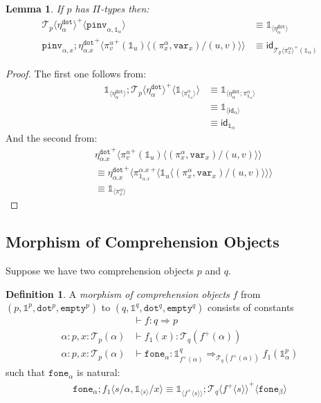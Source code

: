 \documentclass[10pt]{article}
\newtheorem{lemma}{Lemma}
\theoremstyle{definition}
\newtheorem{definition}{Definition}
\newcommand{\yields}{\vdash}
\newcommand{\tcell}{\Rightarrow}
\newcommand{\id}{\mathsf{id}}
\newcommand\TrPlus[2]{\ensuremath{{#1}^+(#2)}}
\newcommand\El[2]{\mathcal{T}_{#1}(#2)}
\newcommand\ApEl[2]{\mathcal{T}_{#1}\langle#2\rangle}
\newcommand\ap[2]{\ensuremath{#1 \langle #2 \rangle }}
\newcommand\ApPlus[2]{\ensuremath{{#1}^+ \langle #2 \rangle }}
\newcommand{\tdot}{\ensuremath{\mathtt{dot}}}
\newcommand{\tempty}{\ensuremath{\mathtt{empty}}}
\newcommand\One{\ensuremath{\mathds{1}}}
\newcommand\var[1]{\ensuremath{\mathtt{var}_{#1}}}
\newcommand\ApOne[1]{\ensuremath{\One_{\langle {#1} \rangle }}}
\newcommand\pinv[1]{\ensuremath{\mathtt{pinv}_{#1}}}
\newcommand\fone[1]{\ensuremath{\mathtt{fone}_{#1}}}
\begin{document}
\begin{lemma}
If $p$ has $\Pi$-types then:
\begin{align*}
\ApPlus{\ApEl{p}{\eta^\tdot_\alpha}}{\pinv{\alpha,\One_\alpha}} &\equiv  \ApOne{\eta^\tdot_\alpha} \\
\pinv{\alpha,x};\ApPlus{\eta^\tdot_{\alpha.x}}{\ap{\TrPlus{\pi^u_v}{\One_u}}{(\pi^\alpha_x,\var{x})/(u,v)}} &\equiv \id_{\TrPlus{\ApEl{p}{\pi^\alpha_x}}{\One_\alpha}}
\end{align*}
\end{lemma}
\begin{proof}
The first one follows from:
\begin{align*}
\ApOne{\eta^\tdot_\alpha} ; \ApPlus{\ApEl{p}{\eta^\tdot_\alpha}}{\ApOne{\pi^\alpha_{\One_\alpha}}} 
&\equiv \ApOne{\eta^\tdot_\alpha;\pi^\alpha_{\One_\alpha}}  \\
&\equiv \ApOne{\id_\alpha} \\
&\equiv \id_{\One_\alpha}
\end{align*}
And the second from:
\begin{align*}
&\ApPlus{\eta^\tdot_{\alpha.x}}{\ap{\TrPlus{\pi^u_v}{\One_u}}{(\pi^\alpha_x,\var{x})/(u,v)}} \\
&\equiv \ApPlus{\eta^\tdot_{\alpha.x}}{\ApPlus{\pi^{\alpha.x}_{1_{\alpha.x}}}{\ap{\One_u}{(\pi^\alpha_x,\var{x})/(u,v)}}} \\
&\equiv \ApOne{\pi^\alpha_x}
\end{align*}
\end{proof}

\subsection{Morphism of Comprehension Objects}

Suppose we have two comprehension objects $p$ and $q$.

\begin{definition}\label{def:morphism-comprehension-object}
A \emph{morphism of comprehension objects} $f$ from $(p, \One^p, \tdot^p, \tempty^p)$ to $(q, \One^q, \tdot^q, \tempty^q)$ consists of constants
\begin{align*}
&\yields f : q \tcell p \\
\alpha : p, x : \El{p}{\alpha} &\yields f_1(x) : \El{q}{\TrPlus{f}{\alpha}} \\
\alpha : p, x : \El{p}{\alpha} &\yields \fone{\alpha} : \One^q_{\TrPlus{f}{\alpha}}  \tcell_{\El{q}{\TrPlus{f}{\alpha}}} f_1(\One^p_\alpha)
\end{align*}
such that $\fone{\alpha}$ is natural:
\begin{align}
\fone{\alpha};\ap{f_1}{s/\alpha, \ApOne{s}/x} \equiv \ApOne{\ApPlus{f}{s}};\ApPlus{\ApEl{q}{\ApPlus{f}{s}}}{\fone{\beta}}
\end{align}
\end{definition}
\end{document}
